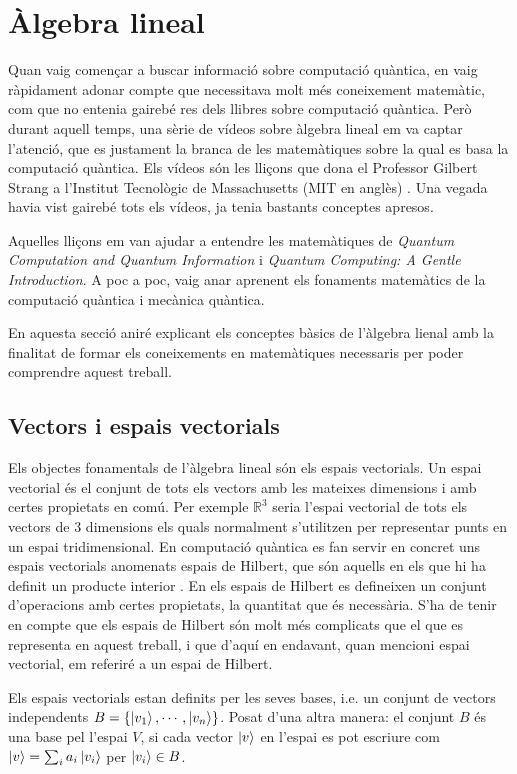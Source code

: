 \chapter{Àlgebra lineal}\label{algebra}
Quan vaig començar a buscar informació sobre computació quàntica, en vaig ràpidament adonar compte que necessitava molt més coneixement matemàtic, com que no entenia gairebé res dels llibres sobre computació quàntica. Però durant aquell temps, una sèrie de vídeos sobre àlgebra lineal em va captar l'atenció, que es justament la branca de les matemàtiques sobre la qual es basa la computació quàntica. Els vídeos són les lliçons que dona el Professor Gilbert Strang a l'Institut Tecnològic de Massachusetts (MIT en anglès) \cite{LA_OCW_strang, LA2_OCW_strang}. Una vegada havia vist gairebé tots els vídeos, ja tenia bastants conceptes apresos.

Aquelles lliçons em van ajudar a entendre les matemàtiques de \textit{Quantum Computation and Quantum Information} \cite{QCandQI} i \textit{Quantum Computing: A Gentle Introduction}. A poc a poc, vaig anar aprenent els fonaments matemàtics de la computació quàntica i mecànica quàntica.

En aquesta secció aniré explicant els conceptes bàsics de l'àlgebra lienal amb la finalitat de formar els coneixements en matemàtiques necessaris per poder comprendre aquest treball.

\section{Vectors i espais vectorials}
Els objectes fonamentals de l'àlgebra lineal són els espais vectorials. Un espai vectorial és el conjunt de tots els vectors amb les mateixes dimensions i amb certes propietats en comú. Per exemple $\mathbb{R}^{3}$ seria l'espai vectorial de tots els vectors de 3 dimensions els quals normalment s'utilitzen per representar punts en un espai tridimensional. En computació quàntica es fan servir en concret uns espais vectorials anomenats espais de Hilbert, que són aquells en els que hi ha definit un producte interior \cite{QCandQI:GramSchmidt}. En els espais de Hilbert es defineixen un conjunt d'operacions amb certes propietats, la quantitat que és necessària. S'ha de tenir en compte que els espais de Hilbert són molt més complicats que el que es representa en aquest treball, i que d'aquí en endavant, quan mencioni espai vectorial, em referiré a un espai de Hilbert.

Els espais vectorials estan definits per les seves bases, i.e. un conjunt de vectors independents $B = \{\ket{v_1}, \cdots, \ket{v_n}\}$. Posat d'una altra manera: el conjunt $B$ és una base pel l'espai $V$, si cada vector $\ket{v}$ en l'espai es pot escriure com $\ket{v} = \sum_i a_i \ket{v_i}$ per $\ket{v_i} \in B$.

